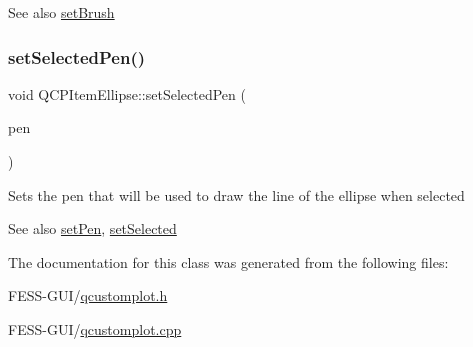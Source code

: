 \begin{DoxySeeAlso}{See also}
\hyperlink{class_q_c_p_item_ellipse_a49fc74e6965834e873d027d026def798}{set\+Brush} 
\end{DoxySeeAlso}
\hypertarget{class_q_c_p_item_ellipse_a6c542fba1dc918041c583f58a50dde99}{}\label{class_q_c_p_item_ellipse_a6c542fba1dc918041c583f58a50dde99} 
\subsubsection{\texorpdfstring{set\+Selected\+Pen()}{setSelectedPen()}}
{\footnotesize\ttfamily void Q\+C\+P\+Item\+Ellipse\+::set\+Selected\+Pen (\begin{DoxyParamCaption}\item[{const Q\+Pen \&}]{pen }\end{DoxyParamCaption})}

Sets the pen that will be used to draw the line of the ellipse when selected

\begin{DoxySeeAlso}{See also}
\hyperlink{class_q_c_p_item_ellipse_adb81a663ed2420fcfa011e49f678d1a6}{set\+Pen}, \hyperlink{class_q_c_p_abstract_item_a203de94ad586cc44d16c9565f49d3378}{set\+Selected} 
\end{DoxySeeAlso}


The documentation for this class was generated from the following files\+:\begin{DoxyCompactItemize}
\item 
F\+E\+S\+S-\/\+G\+U\+I/\hyperlink{qcustomplot_8h}{qcustomplot.\+h}\item 
F\+E\+S\+S-\/\+G\+U\+I/\hyperlink{qcustomplot_8cpp}{qcustomplot.\+cpp}\end{DoxyCompactItemize}
